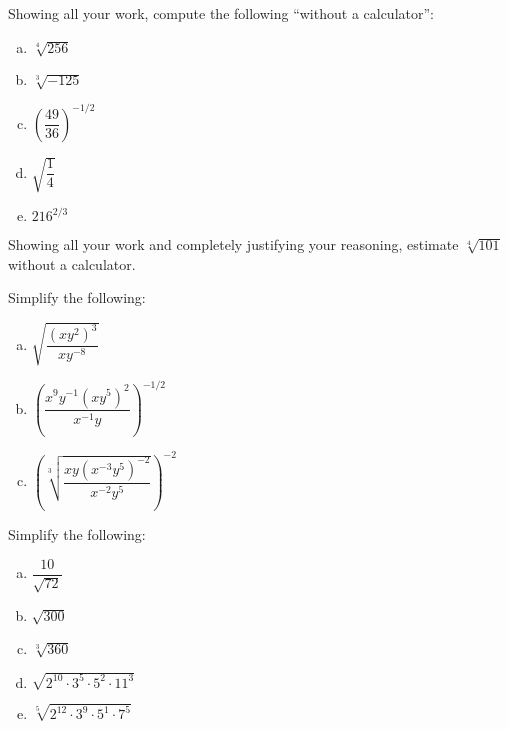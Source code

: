 \documentclass[11pt,letterpaper]{article}
\begin{document}

 Showing all your work, compute the following ``without a calculator'': 
	\begin{enumerate}[(a)]
	\item $\sqrt[4]{256}$
	\item $\sqrt[3]{-125}$
	\item $\left( \dfrac{49}{36} \right)^{-1/2}$
	\item $\sqrt{\dfrac{1}{4}}$
	\item $216^{2/3}$
	\end{enumerate}   



\newpage



 Showing all your work and completely justifying your reasoning, estimate $\sqrt[4]{101}$ without a calculator. 



\newpage



 Simplify the following:
	\begin{enumerate}[(a)]
	\item $\sqrt{\dfrac{(x y^2)^3}{x y^{-8}}}$
	\item $\left( \dfrac{x^9 y^{-1} (x y^5)^2}{x^{-1} y} \right)^{-1/2}$
	\item $\left( \sqrt[3]{\dfrac{xy (x^{-3} y^5)^{-2}}{x^{-2} y^5}} \right)^{-2}$
	\end{enumerate}   	



\newpage



 Simplify the following:
	\begin{enumerate}[(a)]
	\item $\dfrac{10}{\sqrt{72}}$
	\item $\sqrt{300}$
	\item $\sqrt[3]{360}$
	\item $\sqrt{2^{10} \cdot 3^5 \cdot 5^2 \cdot 11^{3}}$
	\item $\sqrt[5]{2^{12} \cdot 3^9 \cdot 5^1 \cdot 7^5}$
	\end{enumerate}   
\end{document}
